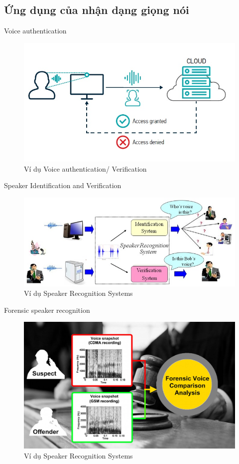 \documentclass[notheorems, aspectratio=54]{beamer}
\begin{document}
\subsection{Ứng dụng của nhận dạng giọng nói}
\begin{frame}{Voice authentication}
	\begin{figure}[h!]
		\includegraphics[width=0.9\linewidth]{images/voice_authentication.jpg}
		\caption{Ví dụ Voice authentication/ Verification}
		\label{fig:writing-thesis}
	\end{figure}
\end{frame}	
\begin{frame}{Speaker Identification and Verification}
	\begin{figure}[H]
		\includegraphics[width=0.9\linewidth]{images/speaker_identification_verification.jpeg}
		\caption{Ví dụ Speaker Recognition Systems}
		\label{fig:writing-thesis}
	\end{figure}
\end{frame}
\begin{frame}{Forensic speaker recognition}
	\begin{figure}[H]
		\includegraphics[width=0.9\linewidth]{images/forensic_voice.jpg}
		\caption{Ví dụ Speaker Recognition Systems}
		\label{fig:writing-thesis}
\end{figure}
\end{frame}
\end{document}
